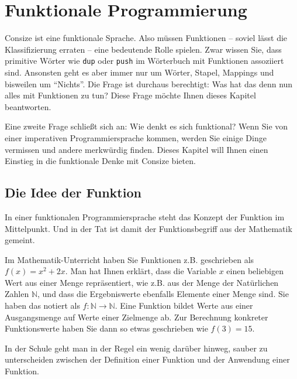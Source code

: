 \chapter{Funktionale Programmierung}

Consize ist eine funktionale Sprache. Also müssen Funktionen -- soviel lässt die Klassifizierung erraten -- eine bedeutende Rolle spielen. Zwar wissen Sie, dass primitive Wörter wie \verb|dup| oder \verb|push| im Wörterbuch mit Funktionen assoziiert sind. Ansonsten geht es aber immer nur um Wörter, Stapel, Mappings und bisweilen um "`Nichts"'. Die Frage ist durchaus berechtigt: Was hat das denn nun alles mit Funktionen zu tun? Diese Frage möchte Ihnen dieses Kapitel beantworten.

Eine zweite Frage schließt sich an: Wie denkt es sich funktional? Wenn Sie von einer imperativen Programmiersprache kommen, werden Sie einige Dinge vermissen und andere merkwürdig finden. Dieses Kapitel will Ihnen einen Einstieg in die funktionale Denke mit Consize bieten.

\section{Die Idee der Funktion} 

In einer funktionalen Programmiersprache steht das Konzept der Funktion im Mittelpunkt. Und in der Tat ist damit der Funktionsbegriff aus der Mathematik gemeint.

Im Mathematik-Unterricht haben Sie Funktionen z.B. geschrieben als $f(x)=x^2+2x$. Man hat Ihnen erklärt, dass die Variable $x$ einen beliebigen Wert aus einer Menge repräsentiert, wie z.B. aus der Menge der Natürlichen Zahlen $\mathbb{N}$, und dass die Ergebniswerte ebenfalls Elemente einer Menge sind. Sie haben das notiert als $f:\mathbb{N}\rightarrow\mathbb{N}$. Eine Funktion bildet Werte aus einer Ausgangsmenge auf Werte einer Zielmenge ab. Zur Berechnung konkreter Funktionswerte haben Sie dann so etwas geschrieben wie $f(3)=15$.

In der Schule geht man in der Regel ein wenig darüber hinweg, sauber zu unterscheiden zwischen der Definition einer Funktion und der Anwendung einer Funktion.

